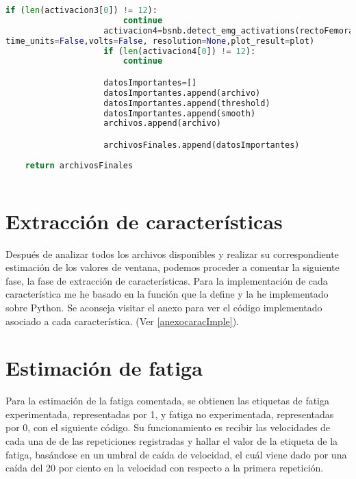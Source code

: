 \begin{lstlisting}[language=Python]
                    if (len(activacion3[0]) != 12):
                        continue
                    activacion4=bsnb.detect_emg_activations(rectoFemoralDerecho,fs,smooth_level=smooth, threshold_level=threshold,
time_units=False,volts=False, resolution=None,plot_result=plot)
                    if (len(activacion4[0]) != 12):
                        continue

                    datosImportantes=[]
                    datosImportantes.append(archivo)
                    datosImportantes.append(threshold)
                    datosImportantes.append(smooth)
                    archivos.append(archivo)

                    archivosFinales.append(datosImportantes)
    
    return archivosFinales
    
\end{lstlisting}

\section{Extracción de características}
Después de analizar todos los archivos disponibles y realizar su correspondiente estimación de los valores de ventana, podemos proceder a comentar la siguiente fase, la fase de extracción de características. Para la implementación de cada característica me he basado en la función que la define y la he implementado sobre Python. Se aconseja visitar el anexo para ver el código implementado asociado a cada característica. (Ver \ref{anexocaracImple}).


\section{Estimación de fatiga}
Para la estimación de la fatiga comentada, se obtienen las etiquetas de fatiga experimentada, representadas por 1, y fatiga no experimentada, representadas por 0, con el siguiente código. Su funcionamiento es recibir las velocidades de cada una de de las repeticiones registradas y hallar el valor de la etiqueta de la fatiga, basándose en un umbral de caída de velocidad, el cuál viene dado por una caída del 20 por ciento en la velocidad con respecto a la primera repetición.

